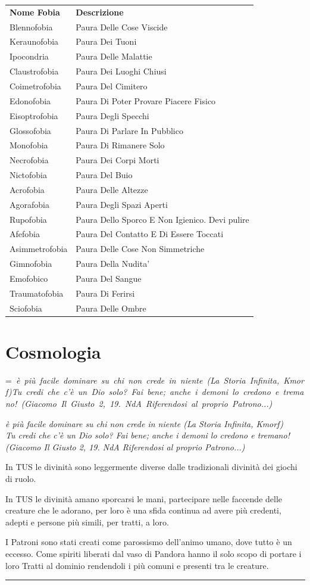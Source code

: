 \documentclass[a4paper,11pt,twoside,openany]{book}
\makeatletter
\newcommand{\mybox}[1]{%
	\setbox0=\hbox{#1}%
	\setlength{\@tempdima}{\dimexpr\wd0+13pt}%
	\begin{tcolorbox}[boxrule=0.5pt,arc=4pt, breakable,enhanced,
		left=6pt,right=6pt,top=6pt,bottom=6pt,boxsep=0pt,width=\@tempdima]
		#1
	\end{tcolorbox}
}
\makeatother
\begin{document}
{\begin{tabular}{L{3cm} L{13cm}}
\toprule
\textbf{Nome Fobia} & \textbf{Descrizione}\tabularnewline
Blennofobia & Paura Delle Cose Viscide\tabularnewline
Keraunofobia & Paura Dei Tuoni\tabularnewline
Ipocondria & Paura Delle Malattie\tabularnewline
Claustrofobia & Paura Dei Luoghi Chiusi\tabularnewline
Coimetrofobia & Paura Del Cimitero\tabularnewline
Edonofobia & Paura Di Poter Provare Piacere Fisico\tabularnewline
Eisoptrofobia & Paura Degli Specchi\tabularnewline
Glossofobia & Paura Di Parlare In Pubblico\tabularnewline
Monofobia & Paura Di Rimanere Solo\tabularnewline
Necrofobia & Paura Dei Corpi Morti\tabularnewline
Nictofobia & Paura Del Buio\tabularnewline
Acrofobia & Paura Delle Altezze\tabularnewline
Agorafobia & Paura Degli Spazi Aperti\tabularnewline
Rupofobia & Paura Dello Sporco E Non Igienico. Devi pulire\tabularnewline
Afefobia & Paura Del Contatto E Di Essere Toccati\tabularnewline
Asimmetrofobia & Paura Delle Cose Non Simmetriche\tabularnewline
Gimnofobia & Paura Della Nudita'\tabularnewline
Emofobico & Paura Del Sangue\tabularnewline
Traumatofobia & Paura Di Ferirsi\tabularnewline
Sciofobia & Paura Delle Ombre\tabularnewline
\end{tabular}

\pagebreak

\section{Cosmologia}

\label{cosmologia}
\mybox{\textit{
è più facile dominare su chi non crede in niente (La Storia Infinita, Kmorf)\\
Tu credi che c'è un Dio solo? Fai bene; anche i demoni lo credono e tremano! (Giacomo Il Giusto 2, 19. NdA Riferendosi al proprio Patrono...)
}}\medskip

In TUS le divinità sono leggermente diverse dalle tradizionali divinità dei giochi di ruolo.

In TUS le divinità amano sporcarsi le mani, partecipare nelle faccende delle creature che le adorano, per loro è una sfida continua ad avere più credenti, adepti e persone più simili, per tratti, a loro.

I Patroni sono stati creati come parossismo dell'animo umano, dove tutto è un eccesso. Come spiriti liberati dal vaso di Pandora hanno il solo scopo di portare i loro Tratti al dominio rendendoli i più comuni e presenti tra le creature.

\noindent\rule{\textwidth}{1pt}

}
\end{document}
